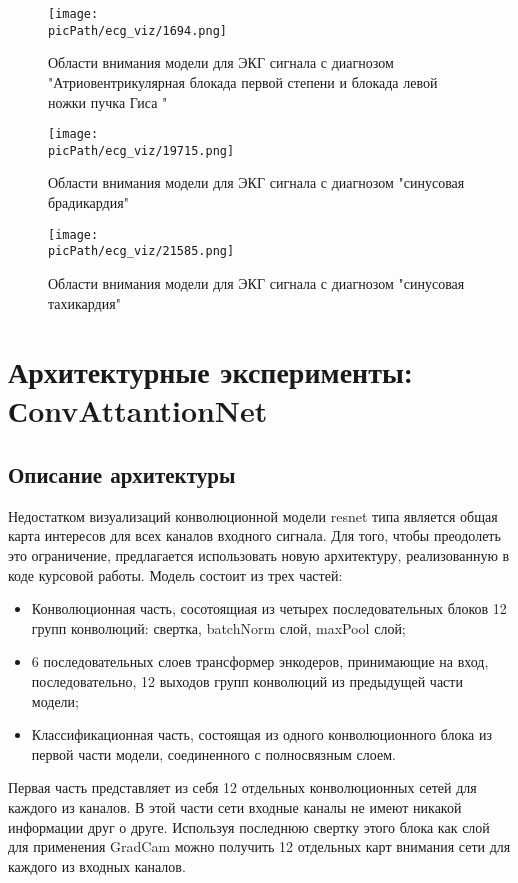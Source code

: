 \documentclass[oneside,final,14pt]{extreport}
\newcommand{\picPath}{img}
\begin{document}
\begin{figure}[H]
\begin{center}
\texttt{[image: \\picPath/ecg\_viz/1694.png]}
\end{center}
  \caption{Области внимания модели для ЭКГ сигнала с диагнозом "Атриовентрикулярная блокада первой степени и блокада левой ножки пучка Гиса "}
  
\end{figure}
\newpage
\begin{figure}[H]
\begin{center}
\texttt{[image: \\picPath/ecg\_viz/19715.png]}
\end{center}
  \caption{Области внимания модели для ЭКГ сигнала с диагнозом "синусовая брадикардия"}

\end{figure}
\newpage
\begin{figure}[H]
\begin{center}
\texttt{[image: \\picPath/ecg\_viz/21585.png]}
\end{center}
  \caption{Области внимания модели для ЭКГ сигнала с диагнозом "синусовая тахикардия"}
  \label{pic:21585.png}
\end{figure}

\section{Архитектурные эксперименты: СonvAttantionNet}
\subsection{Описание архитектуры}
Недостатком визуализаций конволюционной модели resnet типа является общая карта интересов для всех каналов входного сигнала. Для того, чтобы преодолеть это ограничение, предлагается использовать новую архитектуру, реализованную в коде курсовой работы. Модель состоит из трех частей:
\begin{itemize}
\item Конволюционная часть, сосотоящиая из четырех последовательных блоков 12 групп конволюций: свертка, batchNorm слой, maxPool слой;
\item 6 последовательных слоев трансформер энкодеров, принимающие на вход, последовательно, 12 выходов групп конволюций из предыдущей части модели;
\item Классификационная часть, состоящая из одного конволюционного блока из первой части модели, соединенного с полносвязным слоем.
\end{itemize}
Первая часть представляет из себя 12 отдельных конволюционных сетей для каждого из каналов. В этой части сети входные каналы не имеют никакой информации друг о друге. Используя последнюю свертку этого блока как слой для применения GradCam можно получить 12 отдельных карт внимания сети для каждого из входных каналов. 
\end{document}
